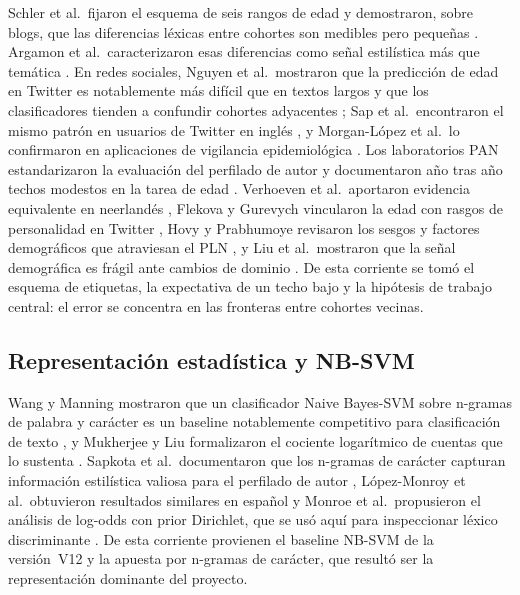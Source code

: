 \documentclass[journal]{IEEEtai}
\begin{document}
Schler et al.\ fijaron el esquema de seis rangos de edad y demostraron, sobre blogs, que las diferencias l\'exicas entre cohortes son medibles pero peque\~nas \cite{schler2006}. Argamon et al.\ caracterizaron esas diferencias como se\~nal estil\'istica m\'as que tem\'atica \cite{argamon2007}. En redes sociales, Nguyen et al.\ mostraron que la predicci\'on de edad en Twitter es notablemente m\'as dif\'icil que en textos largos y que los clasificadores tienden a confundir cohortes adyacentes \cite{nguyen2011,nguyen2013,nguyen2014}; Sap et al.\ encontraron el mismo patr\'on en usuarios de Twitter en ingl\'es \cite{sap2014}, y Morgan-L\'opez et al.\ lo confirmaron en aplicaciones de vigilancia epidemiol\'ogica \cite{morganlopez2017}. Los laboratorios PAN estandarizaron la evaluaci\'on del perfilado de autor y documentaron a\~no tras a\~no techos modestos en la tarea de edad \cite{rangel2013,rangel2014,rangel2015,rangel2016,rangel2017,rangel2018,rangel2019}. Verhoeven et al.\ aportaron evidencia equivalente en neerland\'es \cite{verhoeven2014,verhoeven2016}, Flekova y Gurevych vincularon la edad con rasgos de personalidad en Twitter \cite{flekova2013}, Hovy y Prabhumoye revisaron los sesgos y factores demogr\'aficos que atraviesan el PLN \cite{hovy2018}, y Liu et al.\ mostraron que la se\~nal demogr\'afica es fr\'agil ante cambios de dominio \cite{liu2021}. De esta corriente se tom\'o el esquema de etiquetas, la expectativa de un techo bajo y la hip\'otesis de trabajo central: el error se concentra en las fronteras entre cohortes vecinas.

\subsection{Representaci\'on estad\'istica y NB-SVM}

Wang y Manning mostraron que un clasificador Naive Bayes-SVM sobre n-gramas de palabra y car\'acter es un baseline notablemente competitivo para clasificaci\'on de texto \cite{wang2012}, y Mukherjee y Liu formalizaron el cociente logar\'itmico de cuentas que lo sustenta \cite{mukherjee2010}. Sapkota et al.\ documentaron que los n-gramas de car\'acter capturan informaci\'on estil\'istica valiosa para el perfilado de autor \cite{sapkota2013,sapkota2015}, L\'opez-Monroy et al.\ obtuvieron resultados similares en espa\~nol \cite{lopezmonroy2013} y Monroe et al.\ propusieron el an\'alisis de log-odds con prior Dirichlet, que se us\'o aqu\'i para inspeccionar l\'exico discriminante \cite{monroe2008}. De esta corriente provienen el baseline NB-SVM de la versi\'on~V12 y la apuesta por n-gramas de car\'acter, que result\'o ser la representaci\'on dominante del proyecto.
\end{document}
